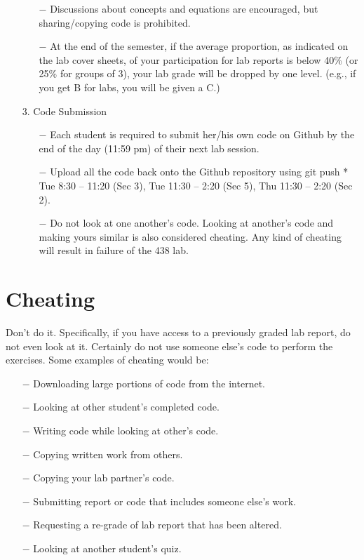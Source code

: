 \documentclass[letterpaper, 11pt]{article}
\begin{document}
\begin{enumerate}
\begin{itemize}
\item[$-$] Discussions about concepts and equations are encouraged, but sharing/copying code is prohibited.
\item[$-$] At the end of the semester, if the average proportion, as indicated on the lab cover sheets, of your participation for lab reports is below 40\% (or 25\% for groups of 3), your lab grade will be dropped by one level. (e.g., if you get B for labs, you will be given a C.)
\end{itemize}
\item[3.] Code Submission
\begin{itemize}
\item[$-$] Each student is required to submit her/his own code on Github by the end of the day (11:59 pm) of their next lab session. 
\item[$-$] Upload all the code back onto the Github repository using git push \newline
* Tue 8:30 – 11:20 (Sec 3), Tue 11:30 – 2:20 (Sec 5), Thu 11:30 – 2:20 (Sec 2). 
\item[$-$] Do not look at one another's code. Looking at another's code and making yours similar is also considered cheating. Any kind of cheating will result in failure of the 438 lab.
\end{itemize}

\end{enumerate}

\newpage
\section*{Cheating}
Don’t do it. Specifically, if you have access to a previously graded lab report, do not even look at it. Certainly do not use someone else’s code to perform the exercises. Some examples of cheating would be:
\begin{itemize}
\item[$-$] Downloading large portions of code from the internet.
\item[$-$] Looking at other student’s completed code.
\item[$-$] Writing code while looking at other’s code.
\item[$-$] Copying written work from others.
\item[$-$] Copying your lab partner's code.
\item[$-$] Submitting report or code that includes someone else's work.
\item[$-$] Requesting a re-grade of lab report that has been altered.
\item[$-$] Looking at another student’s quiz.
\end{itemize}
\end{document}
